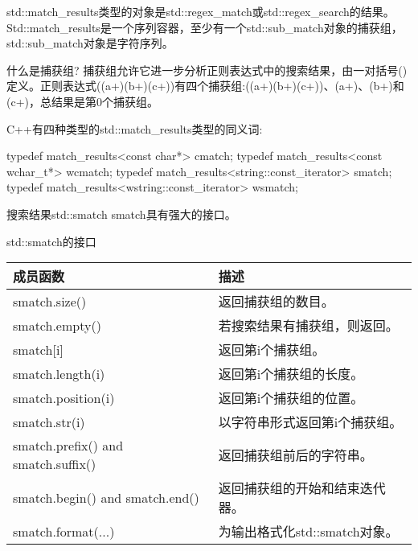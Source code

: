 

std::match\_results类型的对象是std::regex\_match或std::regex\_search的结果。Std::match\_results是一个序列容器，至少有一个std::sub\_match对象的捕获组，std::sub\_match对象是字符序列。

\begin{myNotic}{什么是捕获组?}
捕获组允许它进一步分析正则表达式中的搜索结果，由一对括号()定义。正则表达式((a+)(b+)(c+))有四个捕获组:((a+)(b+)(c+))、(a+)、(b+)和(c+)，总结果是第0个捕获组。
\end{myNotic}

C++有四种类型的std::match\_results类型的同义词:

\begin{cpp}
typedef match_results<const char*> cmatch;
typedef match_results<const wchar_t*> wcmatch;
typedef match_results<string::const_iterator> smatch;
typedef match_results<wstring::const_iterator> wsmatch;
\end{cpp}

搜索结果std::smatch smatch具有强大的接口。

\begin{center}
std::smatch的接口
\end{center}

\begin{longtable}[c]{|l|l|}
\hline
\textbf{成员函数}            & \textbf{描述}                                       \\ \hline
\endfirsthead
%
\endhead
%
smatch.size()                       & 返回捕获组的数目。                      \\ \hline
smatch.empty()                      & 若搜索结果有捕获组，则返回。          \\ \hline
smatch{[}i{]}                       & 返回第i个捕获组。                            \\ \hline
smatch.length(i)                    & 返回第i个捕获组的长度。              \\ \hline
smatch.position(i)                  & 返回第i个捕获组的位置。            \\ \hline
smatch.str(i)                       & 以字符串形式返回第i个捕获组。                  \\ \hline
smatch.prefix() and smatch.suffix() & 返回捕获组前后的字符串。     \\ \hline
smatch.begin() and smatch.end()     & 返回捕获组的开始和结束迭代器。 \\ \hline
smatch.format(...)                  & 为输出格式化std::smatch对象。                \\ \hline
\end{longtable}

